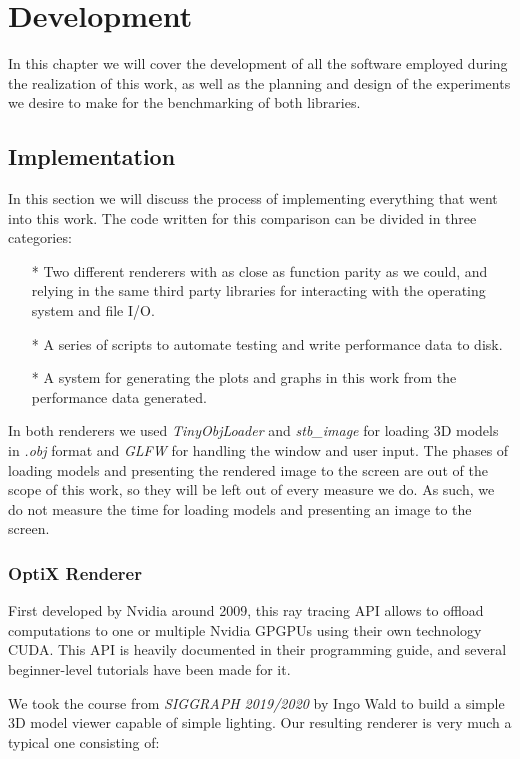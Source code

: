 \chapter{Development}
In this chapter we will cover the development of all the software employed during the realization of this work, as well as the planning and design of the experiments we desire to make for the benchmarking of both libraries.

\clearpage
\section{Implementation}
In this section we will discuss the process of implementing everything that went into this work. The code written for this comparison can be divided in three categories:

\begin{itemize}
    \item[*]{Two different renderers with as close as function parity as we could, and relying in the same third party libraries for interacting with the operating system and file I/O.}
    \item[*]{A series of scripts to automate testing and write performance data to disk.}
    \item[*]{A system for generating the plots and graphs in this work from the performance data generated.}
\end{itemize}

In both renderers we used \textit{TinyObjLoader} and \textit{stb\_image} for loading 3D models in \textit{.obj} format and \textit{GLFW} for handling the window and user input. The phases of loading models and presenting the rendered image to the screen are out of the scope of this work, so they will be left out of every measure we do. As such, we do not measure the time for loading models and presenting an image to the screen.

\subsection{OptiX Renderer}
First developed by Nvidia around 2009, this ray tracing API allows to offload computations to one or multiple Nvidia GPGPUs using their own technology CUDA. This API is heavily documented in their programming guide, and several beginner-level tutorials have been made for it.

We took the course from \textit{SIGGRAPH 2019/2020} by Ingo Wald to build a simple 3D model viewer capable of simple lighting. Our resulting renderer is very much a typical one consisting of:

